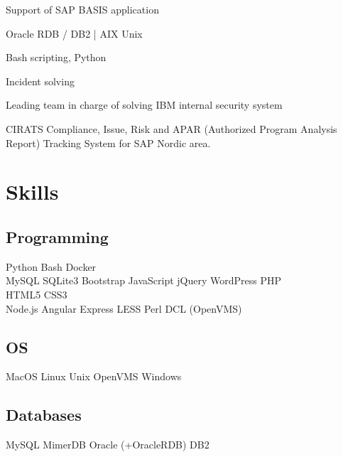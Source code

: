 \documentclass[letterpaper]{deedy-resume.en} %
\begin{document}
\begin{minipage}[t]{0.60\textwidth}
\begin{tightitemize}
\item Support of SAP BASIS application
\item Oracle RDB / DB2 | AIX Unix
\item Bash scripting, Python
\item Incident solving
\item Leading team in charge of solving IBM internal security system
\item CIRATS Compliance, Issue, Risk and APAR (Authorized Program Analysis Report) Tracking System for SAP Nordic area.
\end{tightitemize}
\sectionspace %

\section{Skills}

\subsection{Programming}
Python \textbullet{} Bash \textbullet{} Docker \\
MySQL \textbullet{} SQLite3 \textbullet{} Bootstrap \textbullet{} JavaScript \textbullet{} jQuery \textbullet{} WordPress \textbullet{} PHP \\
HTML5 \textbullet{} CSS3 \\
Node.js \textbullet{} Angular \textbullet{} Express \textbullet{} LESS \textbullet{} Perl \textbullet{} DCL (OpenVMS) \\
\sectionspace %

\subsection{OS}
MacOS \textbullet{} Linux \textbullet{} Unix \textbullet{} OpenVMS \textbullet{} Windows \\
\sectionspace %

\subsection{Databases}
MySQL \textbullet{} MimerDB \textbullet{} Oracle (+OracleRDB) \textbullet{} DB2 \\
\sectionspace %


\end{minipage}
\end{document}
